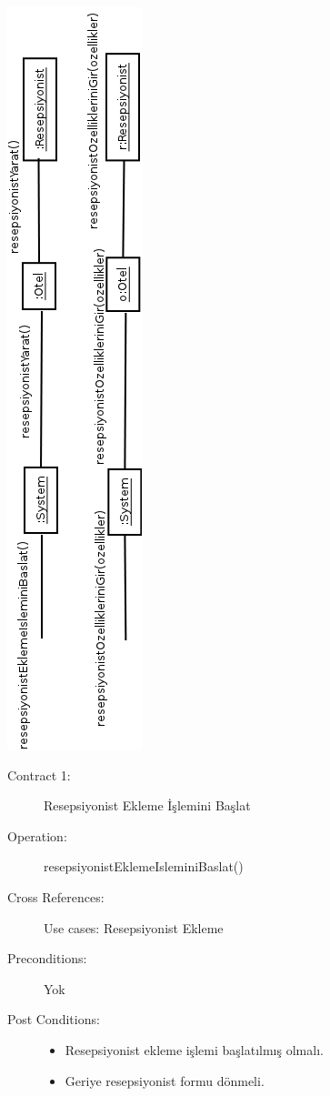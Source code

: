 \documentclass[12pt,a4paper]{report}
\begin{document}
\begin{center}
\includegraphics{dia/eventdiagram-usecase5.png}
\end{center}

\newpage

\begin{description}
\item[Contract 1:] Resepsiyonist Ekleme İşlemini Başlat
\item[Operation:] resepsiyonistEklemeIsleminiBaslat()
\item[Cross References:] Use cases: Resepsiyonist Ekleme
\item[Preconditions:] Yok
\item[Post Conditions:] \hspace{10 mm}
\begin{itemize} 
\item Resepsiyonist ekleme işlemi başlatılmış olmalı.
\item Geriye resepsiyonist formu dönmeli. \\
\end{itemize}
\end{description}
\end{document}
